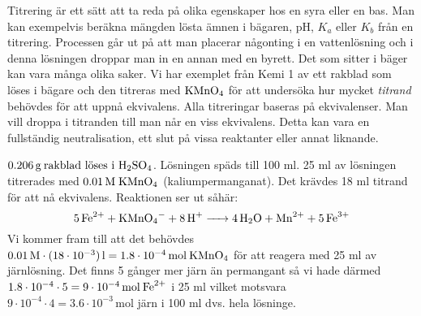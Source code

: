 \begin{wrapfigure}{l}{2cm}
{}
\end{wrapfigure}
Titrering är ett sätt att ta reda på olika egenskaper hos en syra eller en bas. Man kan exempelvis beräkna mängden lösta ämnen i bägaren, pH, $K_a$ eller $K_b$ från en titrering. Processen går ut på att man placerar någonting i en vattenlösning och i denna lösningen droppar man in en annan med en byrett. Det som sitter i bäger kan vara många olika saker. Vi har exemplet från Kemi 1 av ett rakblad som löses i bägare och den titreras med \(\ce{KMnO4}\) för att undersöka hur mycket \emph{titrand} behövdes för att uppnå ekvivalens. Alla titreringar baseras på ekvivalenser. Man vill droppa i titranden till man når en viss ekvivalens. Detta kan vara en fullständig neutralisation, ett slut på vissa reaktanter eller annat liknande. 
\begin{exm}
    \(0.206\, \mathrm{g}\: \text{rakblad löses i } \ce{H2SO4}\). Lösningen späds till 100 ml. 25 ml av lösningen titrerades med \(0.01\, \mathrm{M}\; \ce{KMnO_4}\) (kaliumpermanganat). Det krävdes 18 ml titrand för att nå ekvivalens. Reaktionen ser ut såhär:
    \begin{equation*}
        \ce{5Fe^2+ + KMnO4- + 8H+ -> 4H2O + Mn^2+ + 5Fe^3+}
    \end{equation*}
    \noindent Vi kommer fram till att det behövdes $0.01\, \mathrm{M} \cdot (18 \cdot 10^{-3})\, \mathrm{l} = 1.8 \cdot 10^{-4}\, \mathrm{mol}\: \ce{KMnO4}$ för att reagera med 25 ml av järnlösning. Det finns 5 gånger mer järn än permangant så vi hade därmed $1.8 \cdot 10^{-4} \cdot 5 = 9 \cdot 10^{-4}\, \mathrm{mol} \: \ce{Fe^2+}$ i 25 ml vilket motsvara $9 \cdot 10^{-4} \cdot 4 = 3.6 \cdot 10^{-3} \, \mathrm{mol}$ järn i 100 ml dvs. hela lösninge.
\end{exm}

